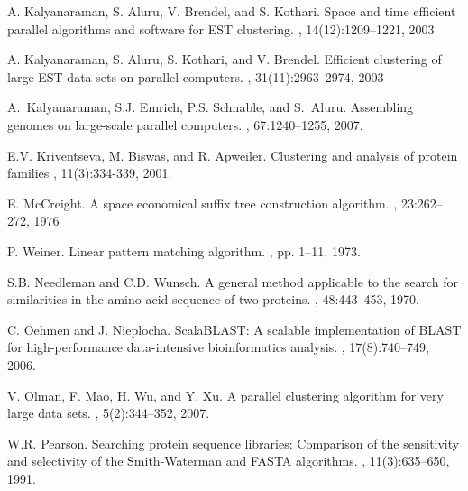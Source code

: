 \documentclass[10pt,journal,letterpaper,compsoc]{IEEEtran}
\begin{document}
\begin{thebibliography}{1}

A. Kalyanaraman, S. Aluru, V. Brendel, and S. Kothari. 
\newblock Space and time efficient parallel algorithms and software for EST clustering. 
, 14(12):1209--1221, 2003

 A. Kalyanaraman, S. Aluru, S. Kothari, and V. Brendel. 
 \newblock Efficient clustering of large EST data sets on parallel computers. 
 , 31(11):2963--2974, 2003

A.~Kalyanaraman, S.J. Emrich, P.S. Schnable, and S.~Aluru.
\newblock Assembling genomes on large-scale parallel computers.
,
  67:1240--1255, 2007.

E.V. Kriventseva, M. Biswas, and R. Apweiler.
\newblock Clustering and analysis of protein families
, 11(3):334-339, 2001.


E. McCreight.
\newblock A space economical suffix tree construction algorithm.
, 23:262--272, 1976


P. Weiner.
\newblock Linear pattern matching algorithm.
, pp. 1--11, 1973.


S.B. Needleman and C.D. Wunsch.
\newblock A general method applicable to the search for similarities in the
  amino acid sequence of two proteins.
, 48:443--453, 1970.


C. Oehmen and J. Nieplocha.
\newblock ScalaBLAST: A scalable implementation of BLAST for high-performance data-intensive bioinformatics analysis.
, 17(8):740--749, 2006.


V. Olman, F. Mao, H. Wu, and Y. Xu.
\newblock A parallel clustering algorithm for very large data sets.
, 5(2):344--352, 2007.


W.R. Pearson.
\newblock Searching protein sequence libraries: Comparison of the sensitivity and selectivity of the Smith-Waterman and FASTA algorithms.
, 11(3):635--650, 1991.


\end{thebibliography}
\end{document}
